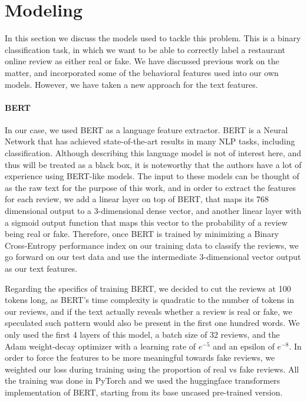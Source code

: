 \documentclass[man, floatsintext, 10pt]{apa6}
\begin{document}
\section{Modeling}

In this section we discuss the models used to tackle this problem. This is a binary classification task, in which we want to be able to correctly label a restaurant online review as either real or fake. We have discussed previous work on the matter, and incorporated some of the behavioral features used into our own models. However, we have taken a new approach for the text features.

\vspace{2mm}

\paragraph{BERT} In our case, we used BERT as a language feature extractor. BERT is a Neural Network that has achieved state-of-the-art results in many NLP tasks, including classification. Although describing this language model is not of interest here, and thus will be treated as a black box, it is noteworthy that the authors have a lot of experience using BERT-like models. The input to these models can be thought of as the raw text for the purpose of this work, and in order to extract the features for each review, we add a linear layer on top of BERT, that maps its 768 dimensional output to a 3-dimensional dense vector, and another linear layer with a sigmoid output function that maps this vector to the probability of a review being real or fake. Therefore, once BERT is trained by minimizing a Binary Cross-Entropy performance index on our training data to classify the reviews, we go forward on our test data and use the intermediate 3-dimensional vector output as our text features. 

Regarding the specifics of training BERT, we decided to cut the reviews at 100 tokens long, as BERT's time complexity is quadratic to the number of tokens in our reviews, and if the text actually reveals whether a review is real or fake, we speculated such pattern would also be present in the first one hundred words. We only used the first 4 layers of this model, a batch size of 32 reviews, and the Adam weight-decay optimizer with a learning rate of $e^{-5}$ and an epsilon of $e^{-8}$. In order to force the features to be more meaningful towards fake reviews, we weighted our loss during training using the proportion of real vs fake reviews. All the training was done in PyTorch and we used the huggingface transformers implementation of BERT, starting from its base uncased pre-trained version.
\end{document}
